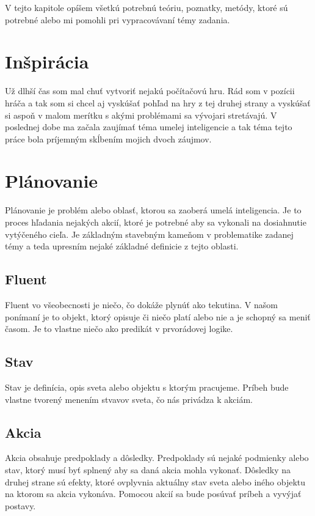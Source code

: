 V tejto kapitole opíšem všetkú potrebnú teóriu, poznatky, metódy, ktoré sú potrebné alebo mi pomohli pri vypracovávaní témy zadania.

\section{Inšpirácia}
Už dlhší čas som mal chuť vytvoriť nejakú počítačovú hru. Rád som v pozícii hráča a tak som si chcel aj vyskúšať pohľad na hry z tej druhej strany a vyskúšať si aspoň v malom merítku s akými problémami sa vývojari stretávajú. V poslednej dobe ma začala zaujímať téma umelej inteligencie a tak téma tejto práce bola príjemným skĺbením mojich dvoch záujmov.

\section{Plánovanie}
Plánovanie je problém alebo oblasť, ktorou sa zaoberá umelá inteligencia. Je to proces hľadania nejakých akcií, ktoré je potrebné aby sa vykonali na dosiahnutie vytýčeného cieľa. Je základným stavebným kameňom v problematike zadanej témy a teda upresním nejaké základné definicie z tejto oblasti.
\subsection{Fluent}
Fluent vo všeobecnosti je niečo, čo dokáže plynúť ako tekutina. V našom ponímaní je to objekt, ktorý opisuje či niečo platí alebo nie a je schopný sa meniť časom. Je to vlastne niečo ako predikát v prvorádovej logike.
\subsection{Stav}
Stav je definícia, opis sveta alebo objektu s ktorým pracujeme. Príbeh bude vlastne tvorený menením stvavov sveta, čo nás privádza k akciám.
\subsection{Akcia}
Akcia obsahuje predpoklady a dôsledky. Predpoklady sú nejaké podmienky alebo stav, ktorý musí byť splnený aby sa daná akcia mohla vykonať. Dôsledky na druhej strane sú efekty, ktoré ovplyvnia aktuálny stav sveta alebo iného objektu na ktorom sa akcia vykonáva. Pomocou akcií sa bude posúvať príbeh a vyvýjať postavy.
